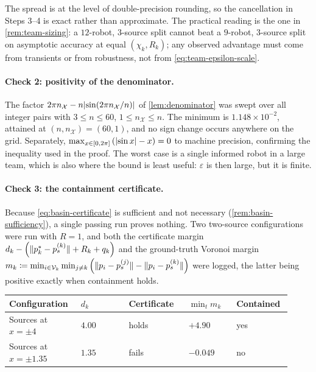 \documentclass[11pt,a4paper]{article}
\theoremstyle{plain}
\theoremstyle{definition}
\newcommand{\V}{\mathcal{V}}
\DeclarePairedDelimiter{\norm}{\lVert}{\rVert}
\DeclarePairedDelimiter{\abs}{\lvert}{\rvert}
\begin{document}
The spread is at the level of double-precision rounding, so the cancellation in Steps 3--4 is
exact rather than approximate. The practical reading is the one in
\cref{rem:team-sizing}: a $12$-robot, $3$-source split cannot beat a $9$-robot, $3$-source split
on asymptotic accuracy at equal $(\chi_k,R_k)$; any observed advantage must come from transients
or from robustness, not from \eqref{eq:team-epsilon-scale}.

\paragraph{Check 2: positivity of the denominator.}
The factor $2\pi n_{\mathcal X}-n\abs{\sin(2\pi n_{\mathcal X}/n)}$ of \cref{lem:denominator} was
swept over all integer pairs with $3\leq n\leq60$, $1\leq n_{\mathcal X}\leq n$. The minimum is
$1.148\times10^{-2}$, attained at $(n,n_{\mathcal X})=(60,1)$, and no sign change occurs anywhere
on the grid. Separately,
$\max_{x\in[0,2\pi]}\left(\abs{\sin x}-x\right)=0$ to machine precision, confirming the
inequality used in the proof. The worst case is a single informed robot in a large team, which is
also where the bound is least useful: $\varepsilon$ is then large, but it is finite.

\paragraph{Check 3: the containment certificate.}
Because \eqref{eq:basin-certificate} is sufficient and not necessary
(\cref{rem:basin-sufficiency}), a single passing run proves nothing. Two two-source
configurations were run with $R=1$, and both the certificate margin
$d_k-\left(\norm{p_k^*-p_s^{(k)}}+R_k+q_k\right)$ and the ground-truth Voronoi margin
$m_k\coloneqq\min_{i\in\V_k}\min_{j\neq k}\left(\norm{p_i-p_s^{(j)}}-\norm{p_i-p_s^{(k)}}\right)$
were logged, the latter being positive exactly when containment holds.

\begin{center}
\begin{longtable}{@{}p{0.24\linewidth}p{0.16\linewidth}p{0.20\linewidth}p{0.16\linewidth}p{0.16\linewidth}@{}}
\toprule
Configuration & $d_k$ & Certificate & $\min_tm_k$ & Contained \\
\midrule
\endhead
Sources at $x=\pm4$ & $4.00$ & holds & $+4.90$ & yes \\
Sources at $x=\pm1.35$ & $1.35$ & fails & $-0.049$ & no \\
\bottomrule
\end{longtable}
\end{center}
\end{document}
